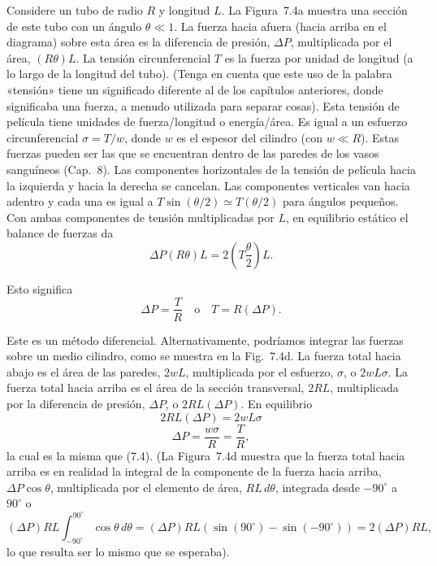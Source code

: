 \documentclass[12pt]{book}
\begin{document}
Considere un tubo de radio $R$ y longitud $L$. La Figura~7.4a muestra una sección de este tubo con un ángulo $\theta \ll 1$. La fuerza hacia afuera (hacia arriba en el diagrama) sobre esta área es la diferencia de presión, $\Delta P$, multiplicada por el área, $(R\theta)L$. La tensión circunferencial $T$ es la fuerza por unidad de longitud (a lo largo de la longitud del tubo). (Tenga en cuenta que este uso de la palabra «tensión» tiene un significado diferente al de los capítulos anteriores, donde significaba una fuerza, a menudo utilizada para separar cosas). Esta tensión de película tiene unidades de fuerza/longitud o energía/área. Es igual a un esfuerzo circunferencial $\sigma = T/w$, donde $w$ es el espesor del cilindro (con $w \ll R$). Estas fuerzas pueden ser las que se encuentran dentro de las paredes de los vasos sanguíneos (Cap.~8). Las componentes horizontales de la tensión de película hacia la izquierda y hacia la derecha se cancelan. Las componentes verticales van hacia adentro y cada una es igual a $T \sin(\theta/2) \simeq T(\theta/2)$ para ángulos pequeños. Con ambas componentes de tensión multiplicadas por $L$, en equilibrio estático el balance de fuerzas da
\begin{equation}
\Delta P(R\theta)L = 2 \left( T \frac{\theta}{2} \right) L.
\label{eq:73}
\end{equation}

Esto significa
\begin{equation}
\Delta P = \frac{T}{R} \quad \text{o} \quad T = R(\Delta P).
\label{eq:74}
\end{equation}


Este es un método diferencial. Alternativamente, podríamos integrar las fuerzas sobre un medio cilindro, como se muestra en la Fig.~7.4d. La fuerza total hacia abajo es el área de las paredes, $2wL$, multiplicada por el esfuerzo, $\sigma$, o $2wL\sigma$. La fuerza total hacia arriba es el área de la sección transversal, $2RL$, multiplicada por la diferencia de presión, $\Delta P$, o $2RL(\Delta P)$. En equilibrio
\begin{equation}
2RL(\Delta P) = 2wL\sigma
\label{eq:75}
\end{equation}
\begin{equation}
\Delta P = \frac{w\sigma}{R} = \frac{T}{R},
\label{eq:76}
\end{equation}
la cual es la misma que (7.4). (La Figura~7.4d muestra que la fuerza total hacia arriba es en realidad la integral de la componente de la fuerza hacia arriba, $\Delta P \cos \theta$, multiplicada por el elemento de área, $RL\,d\theta$, integrada desde $-90^\circ$ a $90^\circ$ o
\begin{equation}
(\Delta P)RL \int_{-90^\circ}^{90^\circ} \cos \theta\,d\theta = (\Delta P)RL (\sin(90^\circ) - \sin(-90^\circ)) = 2(\Delta P)RL,
\label{eq:77}
\end{equation}
lo que resulta ser lo mismo que se esperaba).
\end{document}
